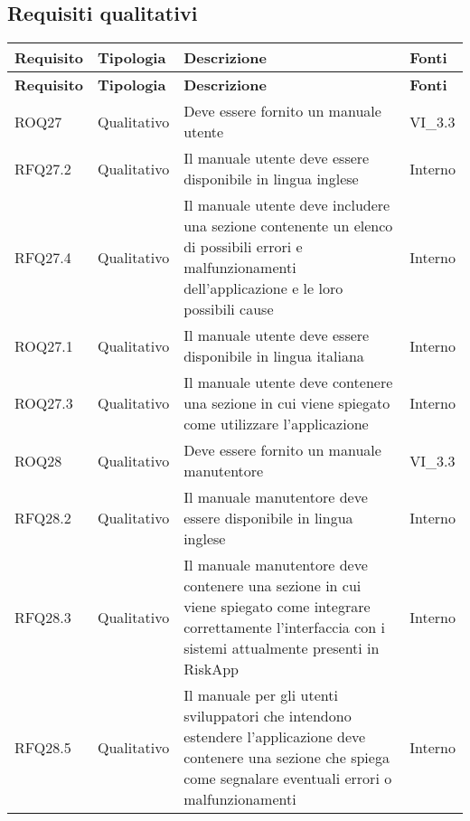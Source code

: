 \subsection{Requisiti qualitativi}
\def\arraystretch{1.5}
\begin{longtable}{p{2cm}!{\VRule[1pt]}p{2cm}!{\VRule[1pt]}p{5cm}!{\VRule[1pt]}p{1.5cm}}
	\color{white} \textbf{Requisito} & \color{white} \textbf{Tipologia} & \color{white} \textbf{Descrizione} & \color{white} \textbf{Fonti} \\ 
	\endfirsthead 
	\color{white} \textbf{Requisito} & \color{white} \textbf{Tipologia} & \color{white} \textbf{Descrizione} & \color{white} \textbf{Fonti} \\ 
	\endhead 
	ROQ27&Qualitativo\newline  & Deve essere fornito un manuale utente & VI_3.3 \\
	RFQ27.2&Qualitativo\newline  & Il manuale utente deve essere disponibile in lingua inglese & Interno \\
	RFQ27.4&Qualitativo\newline  & Il manuale utente deve includere una sezione contenente un elenco di possibili errori e malfunzionamenti dell'applicazione e le loro possibili cause & Interno \\
	ROQ27.1&Qualitativo\newline  & Il manuale utente deve essere disponibile in lingua italiana & Interno \\
	ROQ27.3&Qualitativo\newline  & Il manuale utente deve contenere una sezione in cui viene spiegato come utilizzare l'applicazione & Interno \\
	ROQ28&Qualitativo\newline  & Deve essere fornito un manuale manutentore & VI_3.3 \\
	RFQ28.2&Qualitativo\newline  & Il manuale manutentore deve essere disponibile in lingua inglese & Interno \\
	RFQ28.3&Qualitativo\newline  & Il manuale manutentore deve contenere una sezione in cui viene spiegato come integrare  correttamente l'interfaccia con i sistemi attualmente presenti in RiskApp & Interno \\
	RFQ28.5&Qualitativo\newline  & Il manuale per gli utenti sviluppatori che intendono estendere l'applicazione deve contenere una sezione che spiega come segnalare eventuali errori o malfunzionamenti & Interno \\

\end{longtable}
